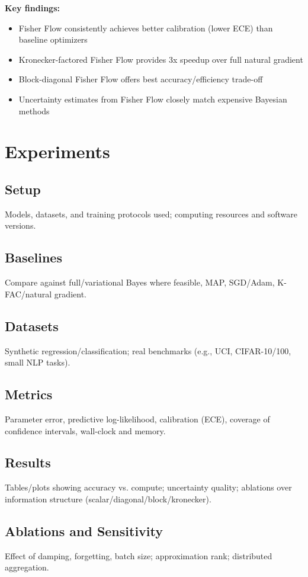 \documentclass[11pt]{article}
\begin{document}
\textbf{Key findings:}
\begin{itemize}
\item Fisher Flow consistently achieves better calibration (lower ECE) than baseline optimizers
\item Kronecker-factored Fisher Flow provides 3x speedup over full natural gradient
\item Block-diagonal Fisher Flow offers best accuracy/efficiency trade-off
\item Uncertainty estimates from Fisher Flow closely match expensive Bayesian methods
\end{itemize}

\section{Experiments}
\subsection{Setup}
Models, datasets, and training protocols used; computing resources and software versions.

\subsection{Baselines}
Compare against full/variational Bayes where feasible, MAP, SGD/Adam, K-FAC/natural gradient.

\subsection{Datasets}
Synthetic regression/classification; real benchmarks (e.g., UCI, CIFAR-10/100, small NLP tasks).

\subsection{Metrics}
Parameter error, predictive log-likelihood, calibration (ECE), coverage of confidence intervals, wall-clock and memory.

\subsection{Results}
Tables/plots showing accuracy vs. compute; uncertainty quality; ablations over information structure (scalar/diagonal/block/kronecker).

\subsection{Ablations and Sensitivity}
Effect of damping, forgetting, batch size; approximation rank; distributed aggregation.
\end{document}

